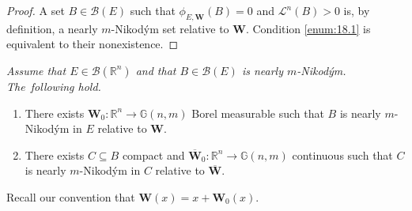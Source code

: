 \documentclass[JEP,XML,SOM,Unicode,ThmDefs,NoEqCountersInSection]{cedram}
\newenvironment{Empty}[2][\null]{%
\begin{enonce}[remark]{#1}#2}
{\end{enonce}}
\newcommand{\R}{\mathbb{R}}
\newcommand{\Rn}{\R^n}
\newcommand{\calB}{\mathscr{B}}
\newcommand{\calL}{\mathscr{L}}
\newcommand{\bW}{{\boldsymbol{W}}}
\newcommand{\bG}{\mathbb{G}}
\let\subset\subseteq
\begin{document}
\begin{proof}
A set $B \in \calB(E)$ such that $\phi_{E,\bW}(B)=0$ and $\calL^n(B) > 0$ is, by definition, a nearly $m$-Nikod\'ym set relative to $\bW$.
Condition \eqref{enum:18.1} is equivalent to their nonexistence.
\end{proof}

\begin{Empty}[]
\label{nik.set}
{\it
Assume that $E \in \calB(\Rn)$ and that $B \in \calB(E)$ is nearly $m$-Nikod\'ym. The~fol\-lowing hold.
\begin{enumerate}
\item\label{enum:19.1} There exists $\bW_0: \Rn \to \bG(n,m)$ Borel measurable such that $B$ is nearly $m$\nobreakdash-Nikod\'ym in $E$ relative to $\bW$.
\item\label{enum:19.2} There exists $C \subset B$ compact and $\overline{\bW}_0: \Rn \to \bG(n,m)$ continuous such that $C$ is nearly $m$-Nikod\'ym in $C$ relative to $\overline{\bW}$.
\end{enumerate}
Recall our convention that $\bW(x) = x + \bW_0(x)$.
}
\end{Empty}
\end{document}
